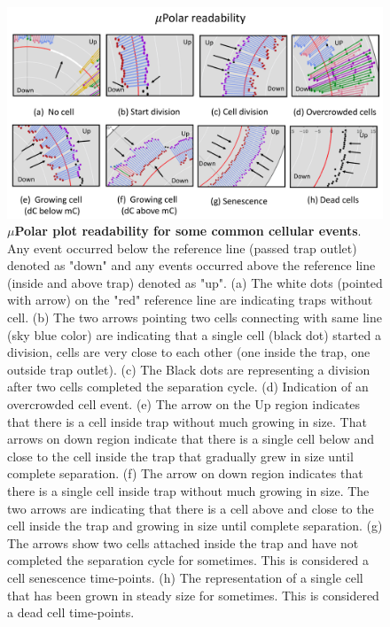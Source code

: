 \documentclass[conference]{IEEEtran}
\begin{document}
\begin{figure}
\centering
\includegraphics[width=\textwidth,height=10 cm]{Patterns/read.pdf}
\caption{\textbf{ $\mu$Polar plot readability for some common cellular events}. Any event occurred below the reference line (passed trap outlet) denoted as "down" and any events occurred above the reference line (inside and above trap) denoted as "up". (a) The white dots (pointed with arrow) on the "red" reference line are indicating traps without cell. (b) The two arrows pointing two cells connecting with same line (sky blue color) are indicating that a single cell (black dot) started a division, cells are very close to each other (one inside the trap, one outside trap outlet). (c) The Black dots are representing a division after two cells completed the separation cycle. (d) Indication of an overcrowded cell event. (e) The arrow on the Up region indicates that there is a cell inside trap without much growing in size. That arrows on down region indicate that there is a single cell below and close to the cell inside the trap that gradually grew in size until complete separation. (f) The arrow on down region indicates that there is a single cell inside trap without much growing in size. The two arrows are indicating that there is a cell above and close to the cell inside the trap and growing in size until complete separation. (g) The arrows show two cells attached inside the trap and have not completed the separation cycle for sometimes. This is considered a cell senescence time-points. (h) The representation of a single cell that has been grown in steady size for sometimes. This is considered a dead cell time-points.}

\label{fig:read}
\end{figure}
\end{document}
